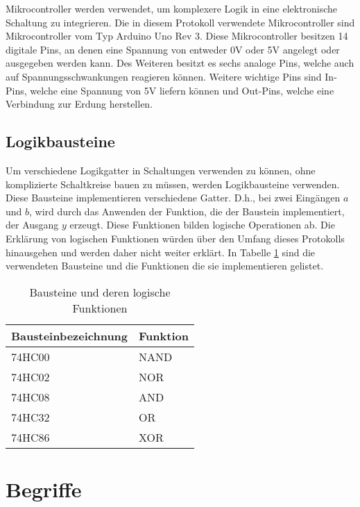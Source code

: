 Mikrocontroller werden verwendet, um komplexere Logik in eine elektronische Schaltung zu integrieren.
Die in diesem Protokoll verwendete Mikrocontroller sind Mikrocontroller vom Typ Arduino Uno Rev 3.
Diese Mikrocontroller besitzen 14 digitale Pins, an denen eine Spannung von entweder 0V oder 5V angelegt oder ausgegeben werden kann.
Des Weiteren besitzt es sechs analoge Pins, welche auch auf Spannungsschwankungen reagieren können.
Weitere wichtige Pins sind In-Pins, welche eine Spannung von 5V liefern können und Out-Pins, welche eine Verbindung zur Erdung herstellen.

\subsection{Logikbausteine}
\label{subsec:logikbausteine}

Um verschiedene Logikgatter in Schaltungen verwenden zu können, ohne komplizierte Schaltkreise bauen zu müssen, werden Logikbausteine verwenden.
Diese Bausteine implementieren verschiedene Gatter.
D.h., bei zwei Eingängen $a$ und $b$, wird durch das Anwenden der Funktion, die der Baustein implementiert, der Ausgang $y$ erzeugt.
Diese Funktionen bilden logische Operationen ab.
Die Erklärung von logischen Funktionen würden über den Umfang dieses Protokolls hinausgehen und werden daher nicht weiter erklärt.
In Tabelle \ref{tab:bausteine-und-deren-logische-funktionen} sind die verwendeten Bausteine und die Funktionen die sie implementieren gelistet.

\begin{table}[ht]
    \centering
    \caption{Bausteine und deren logische Funktionen}
    \label{tab:bausteine-und-deren-logische-funktionen}
    \begin{tabular}{| l | l |}
        \hline
        Bausteinbezeichnung & Funktion \\
        \hline
        74HC00              & NAND     \\
        74HC02              & NOR      \\
        74HC08              & AND      \\
        74HC32              & OR       \\
        74HC86              & XOR      \\
        \hline
    \end{tabular}
\end{table}


\section{Begriffe}
\label{sec:begriffe}

